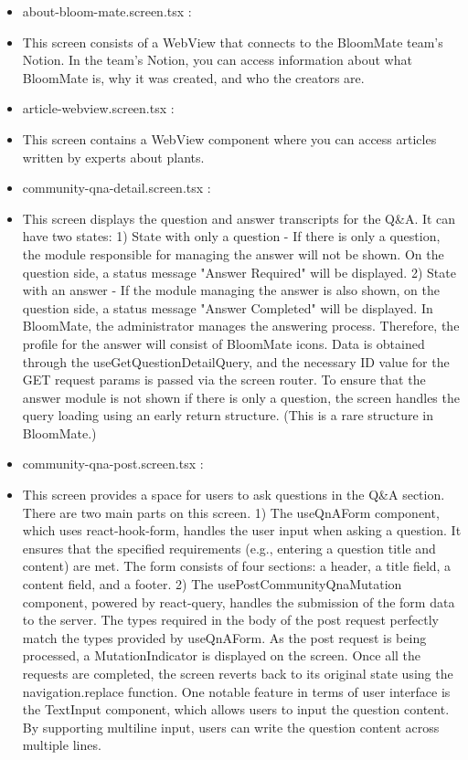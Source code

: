 \documentclass[conference, a4paper]{IEEEtran}
\begin{document}
\begin{enumerate}
\begin{enumerate}
\begin{itemize}
        \item about-bloom-mate.screen.tsx : 
        \item[] This screen consists of a WebView that connects to the BloomMate team's Notion. In the team's Notion, you can access information about what BloomMate is, why it was created, and who the creators are.\\

        \item article-webview.screen.tsx : 
        \item[] This screen contains a WebView component where you can access articles written by experts about plants.\\

        \item community-qna-detail.screen.tsx :
        \item[] This screen displays the question and answer transcripts for the Q&A. It can have two states: 1) State with only a question - If there is only a question, the module responsible for managing the answer will not be shown. On the question side, a status message "Answer Required" will be displayed. 2) State with an answer - If the module managing the answer is also shown, on the question side, a status message "Answer Completed" will be displayed. In BloomMate, the administrator manages the answering process. Therefore, the profile for the answer will consist of BloomMate icons. Data is obtained through the useGetQuestionDetailQuery, and the necessary ID value for the GET request params is passed via the screen router. To ensure that the answer module is not shown if there is only a question, the screen handles the query loading using an early return structure. (This is a rare structure in BloomMate.) \\

        \item community-qna-post.screen.tsx : 
        \item[] This screen provides a space for users to ask questions in the Q\&A section. There are two main parts on this screen. 1) The useQnAForm component, which uses react-hook-form, handles the user input when asking a question. It ensures that the specified requirements (e.g., entering a question title and content) are met. The form consists of four sections: a header, a title field, a content field, and a footer. 2) The usePostCommunityQnaMutation component, powered by react-query, handles the submission of the form data to the server. The types required in the body of the post request perfectly match the types provided by useQnAForm. As the post request is being processed, a MutationIndicator is displayed on the screen. Once all the requests are completed, the screen reverts back to its original state using the navigation.replace function. One notable feature in terms of user interface is the TextInput component, which allows users to input the question content. By supporting multiline input, users can write the question content across multiple lines. \\


\end{itemize}
\end{enumerate}
\end{enumerate}
\end{document}
